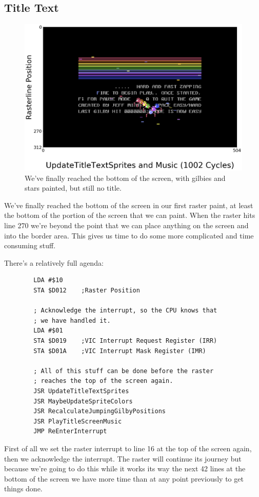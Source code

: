 \subsection{Title Text}
\begin{figure}[H]
    \centering
      \includegraphics[width=12cm]{titlescreen/title57.png}%
\caption{We've finally reached the bottom of the screen, with gilbies and stars painted, but still no title.}
\end{figure}

We've finally reached the bottom of the screen in our first raster paint, at least the bottom of the portion of the
screen that we can paint. When the raster hits line 270 we're beyond the point that we can place anything on the screen and
into the border area. This gives us time to do some more complicated and time consuming stuff.

There's a relatively full agenda:

\begin{lstlisting}
        LDA #$10
        STA $D012    ;Raster Position

        ; Acknowledge the interrupt, so the CPU knows that
        ; we have handled it.
        LDA #$01
        STA $D019    ;VIC Interrupt Request Register (IRR)
        STA $D01A    ;VIC Interrupt Mask Register (IMR)

        ; All of this stuff can be done before the raster
        ; reaches the top of the screen again.
        JSR UpdateTitleTextSprites
        JSR MaybeUpdateSpriteColors
        JSR RecalculateJumpingGilbyPositions
        JSR PlayTitleScreenMusic
        JMP ReEnterInterrupt
\end{lstlisting}

First of all we set the raster interrupt to line 16 at the top of the screen again, then we acknowledge the interrupt. The
raster will continue its journey but because we're going to do this while it works its way the next 42 lines at the bottom 
of the screen we have more time than at any point previously to get things done.

